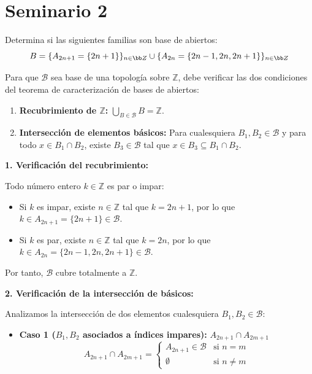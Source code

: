 \section{Seminario 2}
\begin{ejer}
    [23.a] Determina si las siguientes familias son base de abiertos:
    $$B = \{A_{2n+1} = \{2n +1\}\}_{n\in \bb Z} \cup \{A_{2n} = \{2n - 1, 2n, 2n +1\}\}_{n\in \bb Z}$$
\end{ejer}
\begin{sol}
    Para que $\mathcal{B}$ sea base de una topología sobre $\mathbb{Z}$, debe verificar las dos condiciones del teorema de caracterización de bases de abiertos:
    
    \begin{enumerate}
        \item[1.] \textbf{Recubrimiento de $\mathbb{Z}$:} $\displaystyle \bigcup_{B \in \mathcal{B}} B = \mathbb{Z}$.
        \item[2.] \textbf{Intersección de elementos básicos:} Para cualesquiera $B_1, B_2 \in \mathcal{B}$ y para todo $x \in B_1 \cap B_2$, existe $B_3 \in \mathcal{B}$ tal que $x \in B_3 \subseteq B_1 \cap B_2$.
    \end{enumerate}

    \textbf{1. Verificación del recubrimiento:}
    
    Todo número entero $k \in \mathbb{Z}$ es par o impar:
    \begin{itemize}
        \item Si $k$ es impar, existe $n \in \mathbb{Z}$ tal que $k = 2n+1$, por lo que $k \in A_{2n+1} = \{2n+1\} \in \mathcal{B}$.
        \item Si $k$ es par, existe $n \in \mathbb{Z}$ tal que $k = 2n$, por lo que $k \in A_{2n} = \{2n-1, 2n, 2n+1\} \in \mathcal{B}$.
    \end{itemize}
    Por tanto, $\mathcal{B}$ cubre totalmente a $\mathbb{Z}$.

    \medskip

    \textbf{2. Verificación de la intersección de básicos:}

    Analizamos la intersección de dos elementos cualesquiera $B_1, B_2 \in \mathcal{B}$:

    \begin{itemize}
        \item \textbf{Caso 1 ($B_1, B_2$ asociados a índices impares):} $A_{2n+1} \cap A_{2m+1}$
        \[
            A_{2n+1} \cap A_{2m+1} = \begin{cases}
                A_{2n+1} \in \mathcal{B} & \text{si } n = m \\
                \emptyset & \text{si } n \neq m
            \end{cases}
        \]


\end{itemize}
\end{sol}
